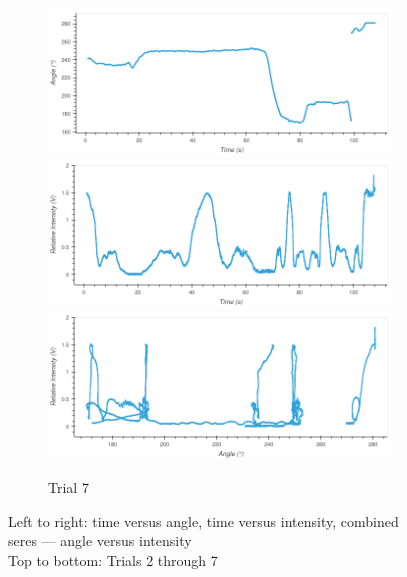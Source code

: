 \begin{figure}
\begin{subfigure}{1.0\textwidth}
\caption{Trial 7}
\includegraphics[width=\plotwidth]{plots/t8-time-angle.png}
\includegraphics[width=\plotwidth]{plots/t8-time-intensity.png}
\includegraphics[width=\plotwidth]{plots/t8-angle-intensity.png}
\end{subfigure}

\caption*{
Left to right: time versus angle, time versus intensity, combined seres — angle versus intensity\\
Top to bottom: Trials 2 through 7
}
\end{figure}

